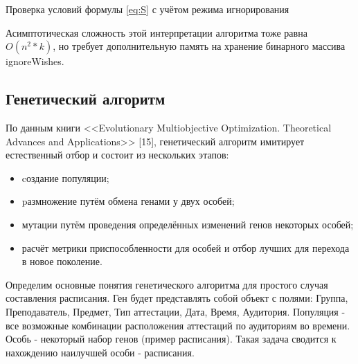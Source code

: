 \begin{algorithm} 
	\nonl{}
	\caption{Проверка условий формулы \eqref{eq:S} с учётом режима игнорирования}\label{alg:algoFindNextPr}
\end{algorithm} 
Асимптотическая сложность этой интерпретации алгоритма тоже равна ${O(n^2 * k)}$, но требует дополнительную память на хранение бинарного массива ignoreWishes. 
\FloatBarrier

\subsection{Генетический алгоритм}
По данным книги <<Evolutionary Multiobjective Optimization. Theoretical Advances and Applications>> [15], генетический алгоритм имитирует естественный отбор и состоит из нескольких этапов:
\begin{itemize}
	\item cоздание популяции;
	\item pазмножение путём обмена генами у двух особей;
	\item мутации путём проведения определённых изменений генов некоторых особей;
	\item расчёт метрики приспособленности для особей и отбор лучших для перехода в новое поколение.
\end{itemize}

Определим основные понятия генетического алгоритма для простого случая составления расписания. Ген будет представлять собой объект с полями: Группа, Преподаватель, Предмет, Тип аттестации, Дата, Время, Аудитория. Популяция - все возможные комбинации расположения аттестаций по аудиториям во времени. Особь - некоторый набор генов (пример расписания). Такая задача сводится к нахождению наилучшей особи - расписания.

